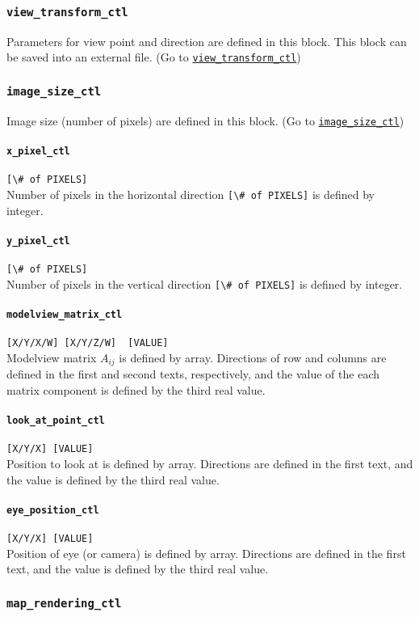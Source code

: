 \subsubsection{\tt view\_transform\_ctl}
\label{href_t:view_transform_ctl}
Parameters for view point and direction are defined in this block. This block can be saved into an external file. (Go to \hyperref[href_i:view_transform_ctl] {\tt view\_transform\_ctl})

\subsubsection*{\tt image\_size\_ctl}
\label{href_t:image_size_ctl}
Image size (number of pixels) are defined in this block. (Go to \hyperref[href_i:image_size_ctl] {\tt image\_size\_ctl})
%
\paragraph{\tt x\_pixel\_ctl}
\label{href_t:x_pixel_ctl}  
\verb|[\# of PIXELS]| \\
Number of pixels in the horizontal direction \verb|[\# of PIXELS]| is defined by integer.
%
\paragraph{\tt y\_pixel\_ctl}
\label{href_t:y_pixel_ctl}  
\verb|[\# of PIXELS]| \\
Number of pixels in the vertical direction \verb|[\# of PIXELS]| is defined by integer.
%
\paragraph{\tt modelview\_matrix\_ctl}
\label{href_t:modelview_matrix_ctl}  
\verb|[X/Y/X/W] [X/Y/Z/W]  [VALUE]| \\
Modelview matrix $A_{ij}$ is defined by array. Directions of row and columns are defined in the first and second texts, respectively, and the value of the each matrix component is defined by the third real value.
%
\paragraph{\tt look\_at\_point\_ctl}
\label{href_t:look_at_point_ctl}  
\verb|[X/Y/X] [VALUE]| \\
Position to look at is defined by array. Directions are defined in the first text, and the value is defined by the third real value.
%
\paragraph{\tt eye\_position\_ctl}
\label{href_t:eye_position_ctl}  
\verb|[X/Y/X] [VALUE]| \\
Position of eye (or camera) is defined by array. Directions are defined in the first text, and the value is defined by the third real value.
%
%

%
\subsubsection{\tt map\_rendering\_ctl}
\label{href_t:map_rendering_ctl}
%


